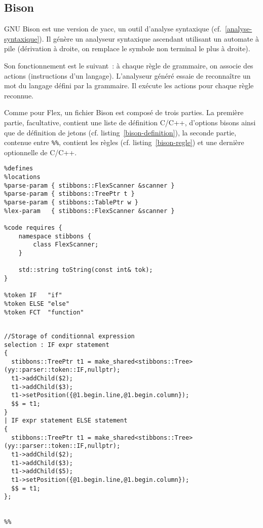 \subsection{Bison}

GNU Bison est une version de yacc, un outil d'analyse syntaxique (cf.~\ref{analyse-syntaxique}). Il génère un analyseur syntaxique ascendant utilisant un automate à pile (dérivation à droite, on remplace le symbole non terminal le plus à droite).

Son fonctionnement est le suivant~: à chaque règle de grammaire, on associe des actions (instructions d'un langage). L'analyseur généré essaie de reconnaître un mot du langage défini par la grammaire. Il exécute les actions pour chaque règle reconnue.

Comme pour Flex, un fichier Bison est composé de trois parties. La première partie, facultative, contient une liste de définition C/C++, d'options bisons ainsi que de définition de jetons (cf. listing~\ref{bison-definition}), la seconde partie, contenue entre \verb|%%|, contient les règles (cf. listing~\ref{bison-regle}) et une dernière optionnelle de C/C++.

\begin{lstlisting}[label=bison-definition,caption=Definition C++ en bison]
%skeleton "lalr1.cc"
%defines
%locations
%parse-param { stibbons::FlexScanner &scanner }
%parse-param { stibbons::TreePtr t }
%parse-param { stibbons::TablePtr w }
%lex-param   { stibbons::FlexScanner &scanner }

%code requires {
	namespace stibbons {
		class FlexScanner;
	}

	std::string toString(const int& tok);
}

%token IF   "if"
%token ELSE "else" 
%token FCT  "function"
\end{lstlisting}

\begin{lstlisting}[label=bison-regle,caption=Règles de grammaire en bison]
%%

//Storage of conditionnal expression
selection : IF expr statement 
{
  stibbons::TreePtr t1 = make_shared<stibbons::Tree>(yy::parser::token::IF,nullptr);
  t1->addChild($2);
  t1->addChild($3);
  t1->setPosition({@1.begin.line,@1.begin.column});
  $$ = t1;
}
| IF expr statement ELSE statement
{
  stibbons::TreePtr t1 = make_shared<stibbons::Tree>(yy::parser::token::IF,nullptr);
  t1->addChild($2);
  t1->addChild($3);
  t1->addChild($5);
  t1->setPosition({@1.begin.line,@1.begin.column});
  $$ = t1;
};


%%
\end{lstlisting}

